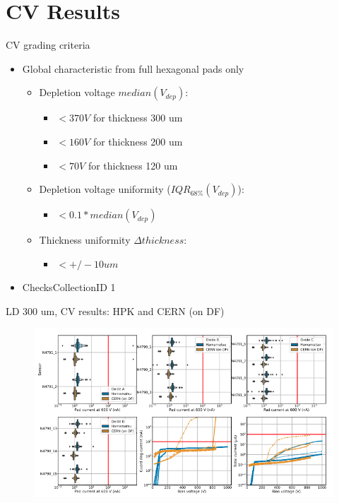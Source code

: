 \documentclass{beamer}
\begin{document}
\section{CV Results}

\begin{frame}{CV grading criteria}
  \begin{itemize}
      \item \alert{Global} characteristic from full hexagonal pads only
        \begin{itemize}
          \item Depletion voltage $ median(V_{dep}) $:
            \begin{itemize}
             \item $ < 370 V $ for thickness 300 um
             \item $ < 160 V $ for thickness 200 um
             \item $ < 70 V $ for thickness 120 um  
            \end{itemize}
          \item Depletion voltage uniformity ($ IQR_{68\%}(V_{dep}) $):
            \begin{itemize}
              \item $< 0.1 * median(V_{dep})$
            \end{itemize}
          \item Thickness uniformity ${\Delta} thickness$:
            \begin{itemize}
              \item $< +/- 10um $
            \end{itemize}
        \end{itemize}
        \item ChecksCollectionID 1
  \end{itemize}
\end{frame}

\begin{frame}{LD 300 um, CV results: HPK and CERN (on DF)}
    \begin{figure}
        \includegraphics[width=.9\textwidth]{plots/CV_CERN_HPK_300um.png}    
    \end{figure}
  \href{https://indico.cern.ch/event/1085830/contributions/4565314/attachments/2344490/3998306/IVCV_recent_HGCal_prototype_sensors_Readiness_Review.pdf}{}
\end{frame}
\end{document}

